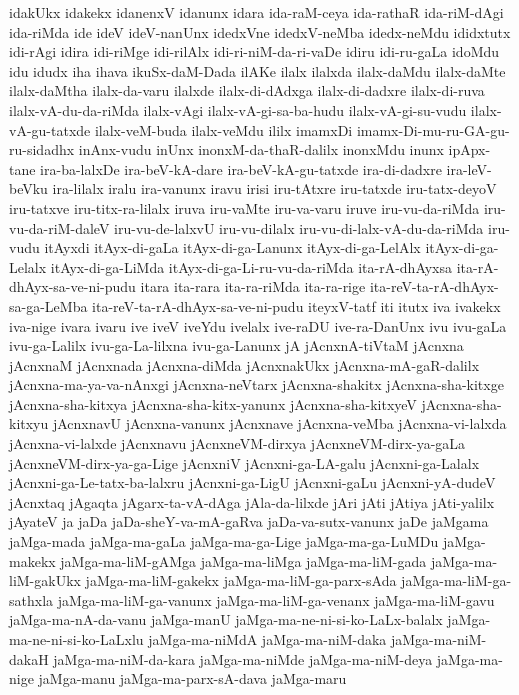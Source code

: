 {idakUkx
idakekx
idanenxV
idanunx
idara
ida-raM-ceya
ida-rathaR
ida-riM-dAgi
ida-riMda
ide
ideV
ideV-nanUnx
idedxVne
idedxV-neMba
idedx-neMdu
ididxtutx
idi-rAgi
idira
idi-riMge
idi-rilAlx
idi-ri-niM-da-ri-vaDe
idiru
idi-ru-gaLa
idoMdu
idu
idudx
iha
ihava
ikuSx-daM-Dada
ilAKe
ilalx
ilalxda
ilalx-daMdu
ilalx-daMte
ilalx-daMtha
ilalx-da-varu
ilalxde
ilalx-di-dAdxga
ilalx-di-dadxre
ilalx-di-ruva
ilalx-vA-du-da-riMda
ilalx-vAgi
ilalx-vA-gi-sa-ba-hudu
ilalx-vA-gi-su-vudu
ilalx-vA-gu-tatxde
ilalx-veM-buda
ilalx-veMdu
ililx
imamxDi
imamx-Di-mu-ru-GA-gu-ru-sidadhx
inAnx-vudu
inUnx
inonxM-da-thaR-dalilx
inonxMdu
inunx
ipApx-tane
ira-ba-lalxDe
ira-beV-kA-dare
ira-beV-kA-gu-tatxde
ira-di-dadxre
ira-leV-beVku
ira-lilalx
iralu
ira-vanunx
iravu
irisi
iru-tAtxre
iru-tatxde
iru-tatx-deyoV
iru-tatxve
iru-titx-ra-lilalx
iruva
iru-vaMte
iru-va-varu
iruve
iru-vu-da-riMda
iru-vu-da-riM-daleV
iru-vu-de-lalxvU
iru-vu-dilalx
iru-vu-di-lalx-vA-du-da-riMda
iru-vudu
itAyxdi
itAyx-di-gaLa
itAyx-di-ga-Lanunx
itAyx-di-ga-LelAlx
itAyx-di-ga-Lelalx
itAyx-di-ga-LiMda
itAyx-di-ga-Li-ru-vu-da-riMda
ita-rA-dhAyxsa
ita-rA-dhAyx-sa-ve-ni-pudu
itara
ita-rara
ita-ra-riMda
ita-ra-rige
ita-reV-ta-rA-dhAyx-sa-ga-LeMba
ita-reV-ta-rA-dhAyx-sa-ve-ni-pudu
iteyxV-tatf
iti
itutx
iva
ivakekx
iva-nige
ivara
ivaru
ive
iveV
iveYdu
ivelalx
ive-raDU
ive-ra-DanUnx
ivu
ivu-gaLa
ivu-ga-Lalilx
ivu-ga-La-lilxna
ivu-ga-Lanunx
jA
jAcnxnA-tiVtaM
jAcnxna
jAcnxnaM
jAcnxnada
jAcnxna-diMda
jAcnxnakUkx
jAcnxna-mA-gaR-dalilx
jAcnxna-ma-ya-va-nAnxgi
jAcnxna-neVtarx
jAcnxna-shakitx
jAcnxna-sha-kitxge
jAcnxna-sha-kitxya
jAcnxna-sha-kitx-yanunx
jAcnxna-sha-kitxyeV
jAcnxna-sha-kitxyu
jAcnxnavU
jAcnxna-vanunx
jAcnxnave
jAcnxna-veMba
jAcnxna-vi-lalxda
jAcnxna-vi-lalxde
jAcnxnavu
jAcnxneVM-dirxya
jAcnxneVM-dirx-ya-gaLa
jAcnxneVM-dirx-ya-ga-Lige
jAcnxniV
jAcnxni-ga-LA-galu
jAcnxni-ga-Lalalx
jAcnxni-ga-Le-tatx-ba-lalxru
jAcnxni-ga-LigU
jAcnxni-gaLu
jAcnxni-yA-dudeV
jAcnxtaq
jAgaqta
jAgarx-ta-vA-dAga
jAla-da-lilxde
jAri
jAti
jAtiya
jAti-yalilx
jAyateV
ja
jaDa
jaDa-sheY-va-mA-gaRva
jaDa-va-sutx-vanunx
jaDe
jaMgama
jaMga-mada
jaMga-ma-gaLa
jaMga-ma-ga-Lige
jaMga-ma-ga-LuMDu
jaMga-makekx
jaMga-ma-liM-gAMga
jaMga-ma-liMga
jaMga-ma-liM-gada
jaMga-ma-liM-gakUkx
jaMga-ma-liM-gakekx
jaMga-ma-liM-ga-parx-sAda
jaMga-ma-liM-ga-sathxla
jaMga-ma-liM-ga-vanunx
jaMga-ma-liM-ga-venanx
jaMga-ma-liM-gavu
jaMga-ma-nA-da-vanu
jaMga-manU
jaMga-ma-ne-ni-si-ko-LaLx-balalx
jaMga-ma-ne-ni-si-ko-LaLxlu
jaMga-ma-niMdA
jaMga-ma-niM-daka
jaMga-ma-niM-dakaH
jaMga-ma-niM-da-kara
jaMga-ma-niMde
jaMga-ma-niM-deya
jaMga-ma-nige
jaMga-manu
jaMga-ma-parx-sA-dava
jaMga-maru
}
